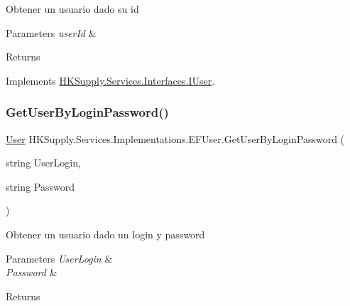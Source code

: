 Obtener un usuario dado su id 


\begin{DoxyParams}{Parameters}
{\em user\+Id} & \\
\hline
\end{DoxyParams}
\begin{DoxyReturn}{Returns}

\end{DoxyReturn}


Implements \hyperlink{interface_h_k_supply_1_1_services_1_1_interfaces_1_1_i_user}{H\+K\+Supply.\+Services.\+Interfaces.\+I\+User}.

\mbox{\label{class_h_k_supply_1_1_services_1_1_implementations_1_1_e_f_user_a69f04e0ab5ba947fc315c60abc7cdbf1}} 
\subsubsection{\texorpdfstring{Get\+User\+By\+Login\+Password()}{GetUserByLoginPassword()}}
{\footnotesize\ttfamily \hyperlink{class_h_k_supply_1_1_models_1_1_user}{User} H\+K\+Supply.\+Services.\+Implementations.\+E\+F\+User.\+Get\+User\+By\+Login\+Password (\begin{DoxyParamCaption}\item[{string}]{User\+Login,  }\item[{string}]{Password }\end{DoxyParamCaption})}



Obtener un usuario dado un login y password 


\begin{DoxyParams}{Parameters}
{\em User\+Login} & \\
\hline
{\em Password} & \\
\hline
\end{DoxyParams}
\begin{DoxyReturn}{Returns}

\end{DoxyReturn}


